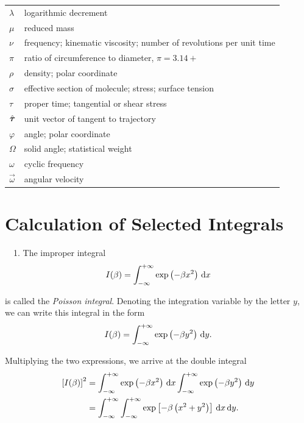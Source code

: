 \begin{table}[h]
\begin{center}
{\begin{tabular}{p{0.5cm} p{11cm}}
                $\lambda$ & logarithmic decrement\\
                $\mu$ & reduced mass\\
                $\nu$ & frequency; kinematic viscosity; number of revolutions per unit time\\
                $\pi$ & ratio of circumference to diameter, $\pi=3.14+$\\
                $\rho$ & density; polar coordinate\\
                $\sigma$ & effective section of molecule; stress; surface tension\\
                $\tau$ & proper time; tangential or shear stress\\
                $\hat{\boldsymbol{\tau}}$ & unit vector of tangent to trajectory\\
                $\varphi$ & angle; polar coordinate\\
                $\Omega$ & solid angle; statistical weight\\
                $\omega$ & cyclic frequency\\
                $\vec{\omega}$ & angular velocity\\
			\end{tabular}
	}\end{center}
\end{table}

\clearpage


\section{Calculation of Selected Integrals}\label{sec:A_2}

$\quad$1. The improper integral
\begin{equation}\label{eq:A_1}
    I(\beta) = \int_{-\infty}^{+\infty} \exp\left(-\beta x^2\right)\,\mathrm{d} x
\end{equation}

\noindent
is called the \textit{Poisson integral}. Denoting the integration variable by the letter $y$, we can write this integral in the form
\begin{equation*}
    I(\beta) = \int_{-\infty}^{+\infty} \exp\left(-\beta y^2\right)\,\mathrm{d} y.
\end{equation*}

\noindent
Multiplying the two expressions, we arrive at the double integral
\begin{align}
    \left[I(\beta)\right]^2 &= \int_{-\infty}^{+\infty} \exp\left(-\beta x^2\right)\,\mathrm{d} x \int_{-\infty}^{+\infty} \exp\left(-\beta y^2\right)\,\mathrm{d} y\nonumber\\
    &= \int_{-\infty}^{+\infty}\int_{-\infty}^{+\infty} \exp\left[-\beta\left(x^2+y^2\right)\right]\,\mathrm{d} x\,\mathrm{d} y.\label{eq:A_2}
\end{align}

